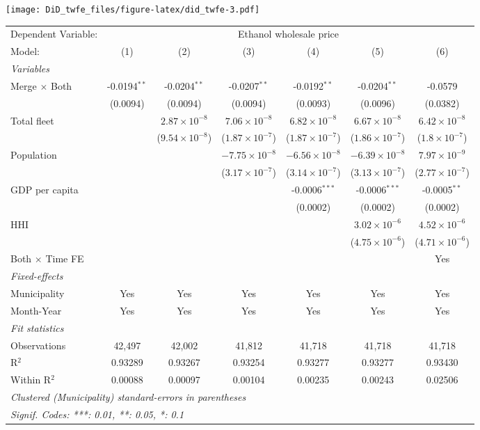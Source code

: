 \documentclass[
]{article}
\begin{document}
\texttt{[image: DiD\_twfe\_files/figure-latex/did\_twfe-3.pdf]}

\begin{tabular}{lcccccc}
\tabularnewline\midrule\midrule
Dependent Variable:&\multicolumn{6}{c}{Ethanol wholesale price}\\
Model:&(1) & (2) & (3) & (4) & (5) & (6)\\
\midrule \emph{Variables}&   &   &   &   &   &  \\
Merge $\times $ Both & -0.0194$^{**}$ & -0.0204$^{**}$ & -0.0207$^{**}$ & -0.0192$^{**}$ & -0.0204$^{**}$ & -0.0579\\
  &(0.0094) & (0.0094) & (0.0094) & (0.0093) & (0.0096) & (0.0382)\\
Total fleet &    & $2.87\times 10^{-8}$ & $7.06\times 10^{-8}$ & $6.82\times 10^{-8}$ & $6.67\times 10^{-8}$ & $6.42\times 10^{-8}$\\
  &   & ($9.54\times 10^{-8}$) & ($1.87\times 10^{-7}$) & ($1.87\times 10^{-7}$) & ($1.86\times 10^{-7}$) & ($1.8\times 10^{-7}$)\\
Population &    &    & $-7.75\times 10^{-8}$ & $-6.56\times 10^{-8}$ & $-6.39\times 10^{-8}$ & $7.97\times 10^{-9}$\\
  &   &    & ($3.17\times 10^{-7}$) & ($3.14\times 10^{-7}$) & ($3.13\times 10^{-7}$) & ($2.77\times 10^{-7}$)\\
GDP per capita &    &    &    & -0.0006$^{***}$ & -0.0006$^{***}$ & -0.0005$^{**}$\\
  &   &    &    & (0.0002) & (0.0002) & (0.0002)\\
HHI &    &    &    &    & $3.02\times 10^{-6}$ & $4.52\times 10^{-6}$\\
  &   &    &    &    & ($4.75\times 10^{-6}$) & ($4.71\times 10^{-6}$)\\
Both $\times$ Time FE &  &  &  &  &  & Yes\\
\midrule \emph{Fixed-effects}&   &   &   &   &   &  \\
Municipality & Yes & Yes & Yes & Yes & Yes & Yes\\
Month-Year & Yes & Yes & Yes & Yes & Yes & Yes\\
\midrule \emph{Fit statistics}&  & & & & & \\
Observations & 42,497&42,002&41,812&41,718&41,718&41,718\\
R$^2$ & 0.93289&0.93267&0.93254&0.93277&0.93277&0.93430\\
Within R$^2$ & 0.00088&0.00097&0.00104&0.00235&0.00243&0.02506\\
\midrule\midrule\multicolumn{7}{l}{\emph{Clustered (Municipality) standard-errors in parentheses}}\\
\multicolumn{7}{l}{\emph{Signif. Codes: ***: 0.01, **: 0.05, *: 0.1}}\\
\end{tabular}
\end{document}
